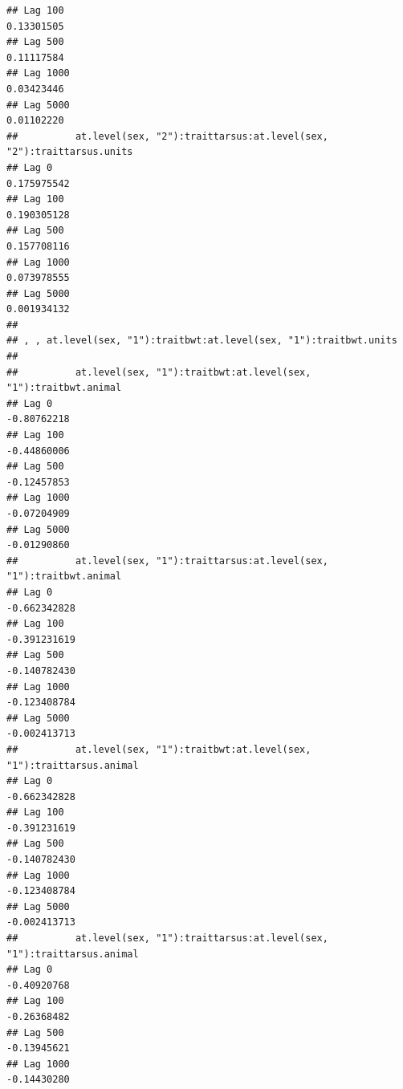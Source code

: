 \documentclass[
  12pt,
]{book}
\begin{document}
\begin{verbatim}
## Lag 100                                                        0.13301505
## Lag 500                                                        0.11117584
## Lag 1000                                                       0.03423446
## Lag 5000                                                       0.01102220
##          at.level(sex, "2"):traittarsus:at.level(sex, "2"):traittarsus.units
## Lag 0                                                            0.175975542
## Lag 100                                                          0.190305128
## Lag 500                                                          0.157708116
## Lag 1000                                                         0.073978555
## Lag 5000                                                         0.001934132
## 
## , , at.level(sex, "1"):traitbwt:at.level(sex, "1"):traitbwt.units
## 
##          at.level(sex, "1"):traitbwt:at.level(sex, "1"):traitbwt.animal
## Lag 0                                                       -0.80762218
## Lag 100                                                     -0.44860006
## Lag 500                                                     -0.12457853
## Lag 1000                                                    -0.07204909
## Lag 5000                                                    -0.01290860
##          at.level(sex, "1"):traittarsus:at.level(sex, "1"):traitbwt.animal
## Lag 0                                                         -0.662342828
## Lag 100                                                       -0.391231619
## Lag 500                                                       -0.140782430
## Lag 1000                                                      -0.123408784
## Lag 5000                                                      -0.002413713
##          at.level(sex, "1"):traitbwt:at.level(sex, "1"):traittarsus.animal
## Lag 0                                                         -0.662342828
## Lag 100                                                       -0.391231619
## Lag 500                                                       -0.140782430
## Lag 1000                                                      -0.123408784
## Lag 5000                                                      -0.002413713
##          at.level(sex, "1"):traittarsus:at.level(sex, "1"):traittarsus.animal
## Lag 0                                                             -0.40920768
## Lag 100                                                           -0.26368482
## Lag 500                                                           -0.13945621
## Lag 1000                                                          -0.14430280

\end{verbatim}
\end{document}
